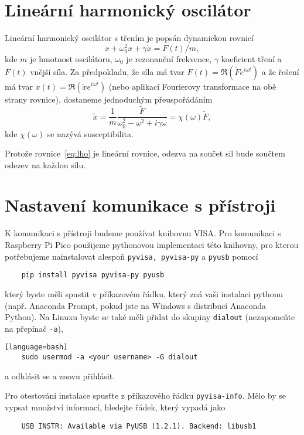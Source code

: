 \newpage
\section{Lineární harmonický oscilátor}
\label{sec:lho}
Lineární harmonický oscilátor s třením je popsán dynamickou rovnicí
\begin{equation}
    \label{eq:lho}
    \ddot x + \omega_0^2 x + \gamma\dot x = F(t)/m,
\end{equation}
kde $m$ je hmotnost oscilátoru, $\omega_0$ je rezonanční frekvence, $\gamma$ koeficient tření a $F(t)$ vnější síla. Za předpokladu, že síla má tvar $F(t) = \Re(\tilde F e^{i\omega t})$ a že řešení má tvar $x(t) = \Re(\tilde x e^{i\omega t})$ (nebo aplikací Fourierovy transformace na obě strany rovnice), dostaneme jednoduchým přeuspořádáním
\begin{equation}
    \tilde x = \frac{1}{m}\frac{\tilde F}{\omega_0^2 - \omega^2 + i\gamma\omega} = \chi(\omega)\tilde F,
\end{equation}
kde $\chi(\omega)$ se nazývá susceptibilita.

Protože rovnice~\ref{eq:lho} je lineární rovnice, odezva na součet sil bude součtem odezev na každou sílu.

\section{Nastavení komunikace s přístroji}
\label{sec:pico}
K komunikaci s přístroji budeme používat knihovnu VISA. Pro komunikaci s Raspberry Pi Pico použijeme pythonovou implementaci této knihovny, pro kterou potřebujeme nainstalovat alespoň \verb|pyvisa, pyvisa-py| a \verb|pyusb| pomocí
\begin{verbatim}
    pip install pyvisa pyvisa-py pyusb
\end{verbatim}
který byste měli spustit v příkazovém řádku, který zná vaši instalaci pythonu (např. Anaconda Prompt, pokud jste na Windows s distribucí Anaconda Python). Na Linuxu byste se také měli přidat do skupiny \verb|dialout| (nezapomeňte na přepínač \verb|-a|),
\begin{verbatim}[language=bash]
    sudo usermod -a <your username> -G dialout 
\end{verbatim}
a odhlásit se a znovu přihlásit.

Pro otestování instalace spusťte z příkazového řádku \verb|pyvisa-info|. Mělo by se vypsat množství informací, hledejte řádek, který vypadá jako
\begin{verbatim}
    USB INSTR: Available via PyUSB (1.2.1). Backend: libusb1
\end{verbatim}

